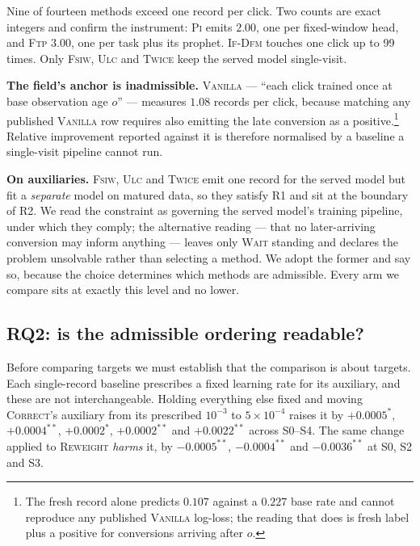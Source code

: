 \documentclass[runningheads]{llncs}
\begin{document}
Nine of fourteen methods exceed one record per click. Two counts are exact integers and confirm the
instrument: \textsc{Pi} emits $2.00$, one per fixed-window head, and \textsc{Ftp} $3.00$, one per
task plus its prophet. \textsc{If-Dfm} touches one click up to 99 times. Only \textsc{Fsiw},
\textsc{Ulc} and \textsc{Twice} keep the served model single-visit.

\smallskip\noindent\textbf{The field's anchor is inadmissible.} \textsc{Vanilla} --- ``each click
trained once at base observation age $o$'' --- measures $1.08$ records per click, because matching
any published \textsc{Vanilla} row requires also emitting the late conversion as a
positive.\footnote{The fresh record alone predicts $0.107$ against a $0.227$ base rate and cannot
reproduce any published \textsc{Vanilla} log-loss; the reading that does is fresh label plus a
positive for conversions arriving after $o$.} Relative improvement reported against it is therefore
normalised by a baseline a single-visit pipeline cannot run.

\smallskip\noindent\textbf{On auxiliaries.} \textsc{Fsiw}, \textsc{Ulc} and \textsc{Twice} emit one
record for the served model but fit a \emph{separate} model on matured data, so they satisfy R1 and
sit at the boundary of R2. We read the constraint as governing the served model's training
pipeline, under which they comply; the alternative reading --- that no later-arriving conversion
may inform anything --- leaves only \textsc{Wait} standing and declares the problem unsolvable
rather than selecting a method. We adopt the former and say so, because the choice determines which
methods are admissible. Every arm we compare sits at exactly this level and no lower.

\subsection{RQ2: is the admissible ordering readable?}\label{sec:tuning}

Before comparing targets we must establish that the comparison is about targets. Each single-record
baseline prescribes a fixed learning rate for its auxiliary, and these are not interchangeable.
Holding everything else fixed and moving \textsc{Correct}'s auxiliary from its prescribed
$10^{-3}$ to $5{\times}10^{-4}$ raises it by $+0.0005^{\ast}$, $+0.0004^{\ast\ast}$,
$+0.0002^{\ast}$, $+0.0002^{\ast\ast}$ and $+0.0022^{\ast\ast}$ across S0--S4. The same change
applied to \textsc{Reweight} \emph{harms} it, by $-0.0005^{\ast\ast}$, $-0.0004^{\ast\ast}$ and
$-0.0036^{\ast\ast}$ at S0, S2 and S3.
\end{document}
